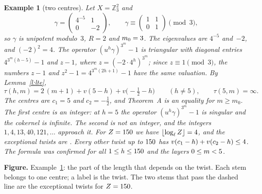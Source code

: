 \documentclass[11pt,a4paper]{article}
\newcommand{\Z}{\mathbb{Z}}
\newcommand{\m}[1]{\mbox{$#1$}}        %
\newcommand{\flog}{\lfloor\log_\ell Z\rfloor}
\theoremstyle{plainx}
\theoremstyle{uprightx}
\newtheorem{example}[theorem]{Example}
\begin{document}
\begin{example}[two centres]\label{e:one}
Let \m{X=\Z_3^2} and
\[
\gamma=\begin{pmatrix}4^{-5}&1\\0&-2\end{pmatrix},\qquad \gamma\equiv\begin{pmatrix}1&1\\0&1\end{pmatrix}\pmod 3 ,
\]
so $\gamma$ is unipotent modulo~$3$, \m{R=2} and \m{m_0=\ExMzero}. The eigenvalues are $4^{-5}$ and~$-2$, and
\m{(-2)^2=4}. The operator \m{(u^h\gamma)^{3^m}-1} is triangular with diagonal entries \m{4^{3^m(h-5)}-1} and
\m{z-1}, where \m{z=(-2\cdot4^h)^{3^m}}; since \m{z\equiv1\pmod 3}, the numbers \m{z-1} and
\m{z^2-1=4^{3^m(2h+1)}-1} have the same valuation. By Lemma~\ref{l:lte},
\[
\tau(h,m)=2\,(m+1)+v(5-h)+v\bigl(-\tfrac12-h\bigr)\qquad(h\ne5),\qquad\tau(5,m)=\infty .
\]
The centres are \m{c_1=5} and \m{c_2=-\frac12}, and Theorem~A is an equality for \m{m\ge m_0}. The first centre is
an integer: at \m{h=5} the operator \m{(u^h\gamma)^{3^m}-1} is singular and the cokernel is infinite. The second
is not an integer, and the integers \m{1,4,13,40,121,\dots} approach it. For \m{Z=\ExZ} we have
\m{\flog=\ExK}, and the exceptional twists are \ExExc. Every other twist up to $150$ has
\m{v(c_1-h)+v(c_2-h)\le\ExWorst}. The formula was confirmed for all \m{1\le h\le\ExZ} and the \ExLevels{} layers
\m{0\le m<\ExLevels}.
\end{example}

\par\vspace{2pt}
\noindent\makebox[\linewidth][c]{}
\par\vspace{-2pt}
{\fontsize{9.2}{12.4}\selectfont\color{inksoft}\noindent\textbf{Figure.} Example~\ref{e:one}: the part of the
length that depends on the twist. Each stem belongs to one centre; a label is the twist. The two stems that pass
the dashed line are the exceptional twists for \m{Z=\ExZ}.\par}
\end{document}
